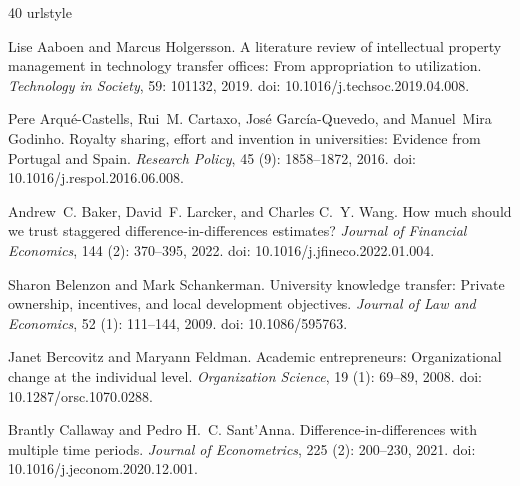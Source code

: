 \begin{thebibliography}{40}
\providecommand{\natexlab}[1]{#1}
\providecommand{\url}[1]{\texttt{#1}}
\expandafter\ifx\csname urlstyle\endcsname\relax
  \providecommand{\doi}[1]{doi: #1}\else
  \providecommand{\doi}{doi: \begingroup \urlstyle{rm}\Url}\fi

Lise Aaboen and Marcus Holgersson.
\newblock A literature review of intellectual property management in technology
  transfer offices: From appropriation to utilization.
\newblock \emph{Technology in Society}, 59: 101132, 2019.
\newblock \doi{10.1016/j.techsoc.2019.04.008}.

Pere Arqu{\'e}-Castells, Rui~M. Cartaxo, Jos{\'e} Garc{\'i}a-Quevedo, and
  Manuel~Mira Godinho.
\newblock Royalty sharing, effort and invention in universities: Evidence from
  {Portugal} and {Spain}.
\newblock \emph{Research Policy}, 45 (9): 1858--1872, 2016.
\newblock \doi{10.1016/j.respol.2016.06.008}.

Andrew~C. Baker, David~F. Larcker, and Charles C.~Y. Wang.
\newblock How much should we trust staggered difference-in-differences
  estimates?
\newblock \emph{Journal of Financial Economics}, 144 (2):
  370--395, 2022.
\newblock \doi{10.1016/j.jfineco.2022.01.004}.

Sharon Belenzon and Mark Schankerman.
\newblock University knowledge transfer: Private ownership, incentives, and
  local development objectives.
\newblock \emph{Journal of Law and Economics}, 52 (1):
  111--144, 2009.
\newblock \doi{10.1086/595763}.

Janet Bercovitz and Maryann Feldman.
\newblock Academic entrepreneurs: Organizational change at the individual
  level.
\newblock \emph{Organization Science}, 19 (1): 69--89, 2008.
\newblock \doi{10.1287/orsc.1070.0288}.

Brantly Callaway and Pedro H.~C. Sant'Anna.
\newblock Difference-in-differences with multiple time periods.
\newblock \emph{Journal of Econometrics}, 225 (2): 200--230,
  2021.
\newblock \doi{10.1016/j.jeconom.2020.12.001}.


\end{thebibliography}
